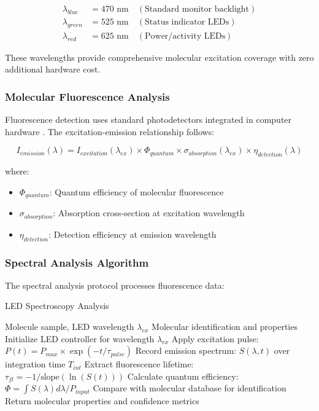 \documentclass[12pt,a4paper]{article}
\begin{document}
\begin{align}
\lambda_{blue} &= 470 \text{ nm} \quad (\text{Standard monitor backlight}) \\
\lambda_{green} &= 525 \text{ nm} \quad (\text{Status indicator LEDs}) \\
\lambda_{red} &= 625 \text{ nm} \quad (\text{Power/activity LEDs})
\end{align}

These wavelengths provide comprehensive molecular excitation coverage with zero additional hardware cost.

\subsubsection{Molecular Fluorescence Analysis}

Fluorescence detection uses standard photodetectors integrated in computer hardware \cite{lakowicz2006principles}. The excitation-emission relationship follows:

\begin{equation}
I_{emission}(\lambda) = I_{excitation}(\lambda_{ex}) \times \Phi_{quantum} \times \sigma_{absorption}(\lambda_{ex}) \times \eta_{detection}(\lambda)
\end{equation}

where:
\begin{itemize}
\item $\Phi_{quantum}$: Quantum efficiency of molecular fluorescence
\item $\sigma_{absorption}$: Absorption cross-section at excitation wavelength
\item $\eta_{detection}$: Detection efficiency at emission wavelength
\end{itemize}

\subsubsection{Spectral Analysis Algorithm}

The spectral analysis protocol processes fluorescence data:

\begin{algorithm}[H]
\caption{LED Spectroscopy Analysis}
\begin{algorithmic}[1]
\REQUIRE Molecule sample, LED wavelength $\lambda_{ex}$
\ENSURE Molecular identification and properties
\STATE Initialize LED controller for wavelength $\lambda_{ex}$
\STATE Apply excitation pulse: $P(t) = P_{max} \times \exp(-t/\tau_{pulse})$
\STATE Record emission spectrum: $S(\lambda, t)$ over integration time $T_{int}$
\STATE Extract fluorescence lifetime: $\tau_{fl} = -1/\text{slope}(\ln(S(t)))$
\STATE Calculate quantum efficiency: $\Phi = \int S(\lambda) d\lambda / P_{input}$
\STATE Compare with molecular database for identification
\STATE Return molecular properties and confidence metrics
\end{algorithmic}
\end{algorithm}
\end{document}

